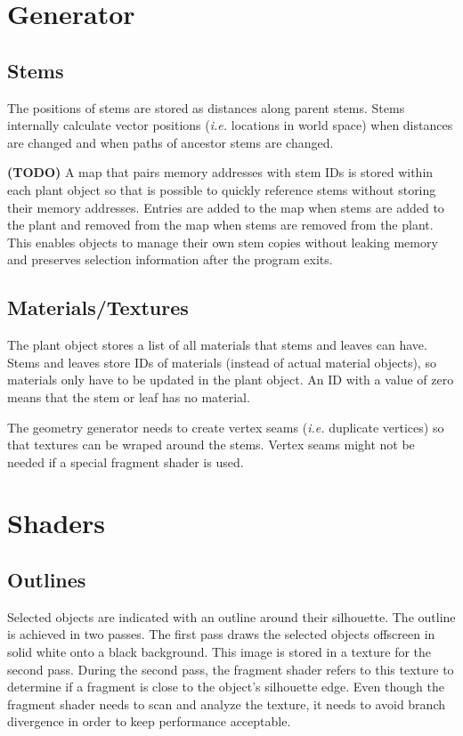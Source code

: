 \documentclass[11pt,letterpaper]{article}
\begin{document}
\section{Generator}

\subsection{Stems}

The positions of stems are stored as distances along parent stems. Stems internally calculate vector positions (\textit{i.e.} locations in world space) when distances are changed and when paths of ancestor stems are changed.

\textbf{(TODO)} A map that pairs memory addresses with stem IDs is stored within each plant object so that is possible to quickly reference stems without storing their memory addresses. Entries are added to the map when stems are added to the plant and removed from the map when stems are removed from the plant. This enables objects to manage their own stem copies without leaking memory and preserves selection information after the program exits.

\subsection{Materials/Textures}

The plant object stores a list of all materials that stems and leaves can have. Stems and leaves store IDs of materials (instead of actual material objects), so materials only have to be updated in the plant object. An ID with a value of zero means that the stem or leaf has no material.

The geometry generator needs to create vertex seams (\textit{i.e.} duplicate vertices) so that textures can be wraped around the stems. Vertex seams might not be needed if a special fragment shader is used.

\section{Shaders}

\subsection{Outlines}

Selected objects are indicated with an outline around their silhouette. The outline is achieved in two passes. The first pass draws the selected objects offscreen in solid white onto a black background. This image is stored in a texture for the second pass. During the second pass, the fragment shader refers to this texture to determine if a fragment is close to the object's silhouette edge. Even though the fragment shader needs to scan and analyze the texture, it needs to avoid branch divergence in order to keep performance acceptable.
\end{document}
